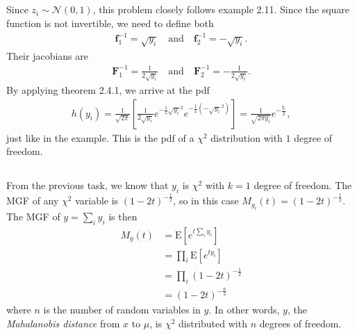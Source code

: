 \documentclass[]{article}
\begin{document}
\subsection{}
Since $z_i \sim \mathcal{N}(0, 1)$, this problem closely follows example 2.11. Since the square function is not invertible, we need to define both
\begin{equation}\begin{aligned}
\mathbf{f}^{-1}_1 = \sqrt{y_i} \quad \text{and} \quad \mathbf{f}^{-1}_2 = -\sqrt{y_i}.
\end{aligned}\end{equation}
Their jacobians are
\begin{equation}\begin{aligned}
\mathbf{F}^{-1}_1 = \frac{1}{2\sqrt{y_i}} \quad \text{and} \quad \mathbf{F}^{-1}_2 = -\frac{1}{2\sqrt{y_i}}.
\end{aligned}\end{equation}
By applying theorem 2.4.1, we arrive at the pdf
\begin{equation}\begin{aligned}
h(y_i)
= \frac{1}{\sqrt{2\pi}}\left[\frac{1}{2\sqrt{y_i}}e^{-\frac{1}{2}\sqrt{y_i}^2}e^{-\frac{1}{2}(-\sqrt{y_i}^2)}\right]
= \frac{1}{\sqrt{2 \pi y_i}}e^{-\frac{y_i}{2}},
\end{aligned}\end{equation}
just like in the example. This is the pdf of a $\chi^2$ distribution with $1$ degree of freedom.

\subsection{}
From the previous task, we know that $y_i$ is $\chi^2$ with $k=1$ degree of freedom. The MGF of any $\chi^2$ variable is $(1-2t)^{-\frac{1}{2}}$, so in this case $M_{y_i}(t) = (1-2t)^{-\frac{1}{2}}$. The MGF of $y=\sum_{i}y_i$ is then
\begin{equation}\begin{aligned}
M_y(t)
&= \text{E}[ e^{t \sum_{i}y_i}] \\
&= \prod_i \text{E}[ e^{t y_i}] \\
&= \prod_i (1 - 2t)^{-\frac{1}{2}} \\
&= (1 - 2t)^{-\frac{n}{2}}
\end{aligned}\end{equation}
where $n$ is the number of random variables in $y$. In other words, $y$, the \textit{Mahalanobis distance} from $x$ to $\mu$, is $\chi^2$ distributed with $n$ degrees of freedom.
\end{document}
